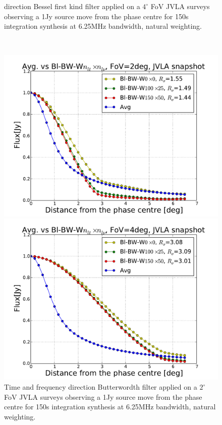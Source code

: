 \documentclass[useAMS,usenatbib]{mn2e}
\begin{document}
\begin{figure}
\begin{minipage}{0.36\linewidth}
{  direction Bessel first kind filter applied on a $4^{\circ}$ FoV JVLA surveys observing a 1Jy source move from the phase centre for 150s 
  integration synthesis at 6.25MHz bandwidth, natural weighting.}\label{fig:Bl-bessel-FoV4}\end{minipage}\\
  \begin{minipage}{0.36\linewidth}\includegraphics[width=1\textwidth]{./Figures/Bl-butter-FoV2-vla.pdf}\caption{Time and frequency 
  direction Butterwordth filter applied on a $2^{\circ}$ FoV JVLA surveys observing a 1Jy source move from the phase centre for 
  150s integration synthesis at 6.25MHz bandwidth, natural weighting.}\label{fig:Bl-butter-FoV2}\end{minipage}
  \hspace{1cm}
  \begin{minipage}{0.36\linewidth}
  \includegraphics[width=1\textwidth]{./Figures/Bl-butter-FoV4-vla.pdf}

\end{minipage}
\end{figure}
\end{document}
